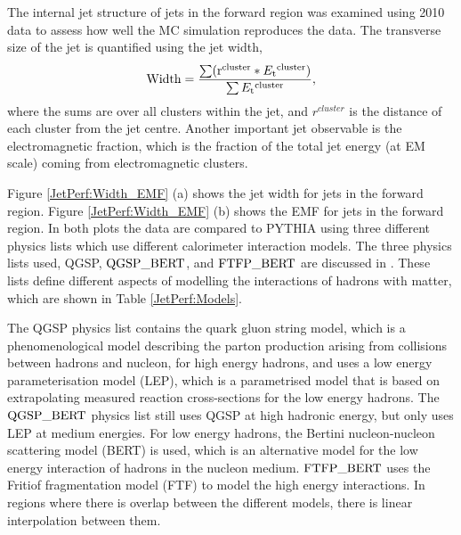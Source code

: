 The internal jet structure of jets in the forward region was examined using 2010 data to assess how well the MC simulation reproduces the data.
The transverse size of the jet is quantified using the jet width,
\begin{equation}
\rm{Width}=\frac{\sum (r^{cluster} * \mbox{$E_{\rm t}$}{}^{cluster}) }{\sum \mbox{$E_{\rm t}$}{}^{cluster}},
\label{JetPerf:Width}
\end{equation}
where the sums are over all clusters within the jet, and $r^{cluster}$ is the distance of each cluster from the jet centre.
Another important jet observable is the electromagnetic fraction, which is the fraction of the total jet energy (at EM scale) coming from electromagnetic clusters.


Figure \ref{JetPerf:Width_EMF} (a) shows the jet width for jets in the forward region.
Figure \ref{JetPerf:Width_EMF} (b) shows the EMF for jets in the forward region.
In both plots the data are compared to PYTHIA using three different physics lists which use different calorimeter interaction models.
The three physics lists used, QGSP, $\rm QGSP\_BERT$, and $\rm FTFP\_BERT$ are discussed in \cite{ref:HadModels}. 
These lists define different aspects of modelling the interactions of hadrons with matter, which are shown in Table \ref{JetPerf:Models}.

The QGSP physics list contains the quark gluon string model, which is a phenomenological model describing the parton production arising from collisions between hadrons and nucleon, for high energy hadrons, and uses a low energy parameterisation model (LEP), which is a parametrised model that is based on extrapolating measured reaction cross-sections for the low energy hadrons.  
The $\rm{QGSP\_BERT}$ physics list still uses QGSP at high hadronic energy, but only uses LEP at medium energies.
For low energy hadrons, the Bertini nucleon-nucleon scattering model (BERT) is used, which is an alternative model for the low energy interaction of hadrons in  the nucleon medium.
$\rm{FTFP\_BERT}$ uses the  Fritiof fragmentation model (FTF) to model the high energy interactions. 
In regions where there is overlap between the different models, there is linear interpolation between them.


